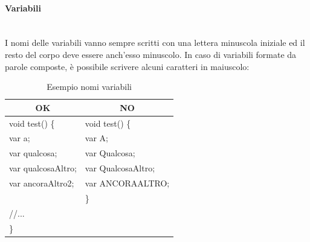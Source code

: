 \paragraph{Variabili}\mbox{}\\[0.4cm]
I nomi delle variabili vanno sempre scritti con una lettera minuscola iniziale ed il resto del corpo deve essere anch’esso minuscolo. In caso di variabili formate da parole composte, è possibile scrivere alcuni caratteri in maiuscolo:
\begin{table} [H]
		\begin{center}
			\begin{tabular}{ | l | l |}
				\multicolumn{1}{c}{\textbf{OK}}&\multicolumn{1}{c}{\textbf{NO}}\\ 
				\hline
				void test() \{
				&void test() \{\\
				\hspace{0.5cm}var a;
				&\hspace{0.5cm}var A;\\
				\hspace{0.5cm}var qualcosa;
				&\hspace{0.5cm}var Qualcosa;\\
				\hspace{0.5cm}var qualcosaAltro;
				&\hspace{0.5cm}var QualcosaAltro;\\
				\hspace{0.5cm}var ancoraAltro2;
				&\hspace{0.5cm}var ANCORAALTRO;\\
				&\}\\
				\hspace{0.5cm}//...									&
				\\
				\}&\\
				\hline
			\end{tabular}
		\end{center}
		\caption{Esempio nomi variabili}
\end{table}
	
